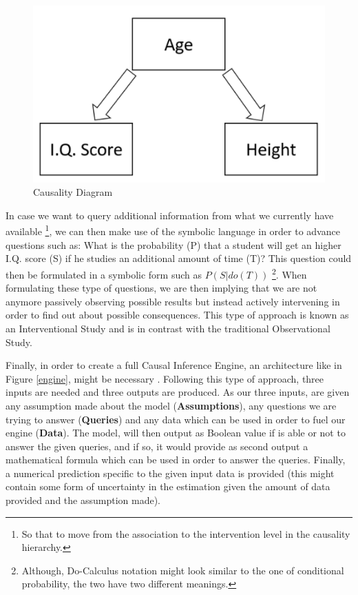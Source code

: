 \begin{figure}[ht!]%
    \centering
    \includegraphics[width=0.4\linewidth]{latex/images/caus_d.pdf}
    \vspace{-0.2cm}
    \caption{Causality Diagram}
    \label{dig_ex}
\end{figure}
\vspace{-0.5cm}

In case we want to query additional information from what we currently have available \footnote{So that to move from the association to the intervention level in the causality hierarchy.}, we can then make use of the symbolic language in order to advance questions such as: What is the probability (P) that a student will get an higher I.Q. score (S) if he studies an additional amount of time (T)? This question could then be formulated in a symbolic form such as $P(S|do(T))$  \footnote{Although, Do-Calculus notation might look similar to the one of conditional probability, the two have two different meanings.}. When formulating these type of questions, we are then implying that we are not anymore passively observing possible results but instead actively intervening in order to find out about possible consequences. This type of approach is known as an Interventional Study and is in contrast with the traditional Observational Study.

Finally, in order to create a full Causal Inference Engine, an architecture like in Figure \ref{engine}, might be necessary \cite{why}. Following this type of approach, three inputs are needed and three outputs are produced. As our three inputs, are given any assumption made about the model (\textbf{Assumptions}), any questions we are trying to answer (\textbf{Queries}) and any data which can be used in order to fuel our engine (\textbf{Data}). The model, will then output as Boolean value if is able or not to answer the given queries, and if so, it would provide as second output a mathematical formula which can be used in order to answer the queries. Finally, a numerical prediction specific to the given input data is provided (this might contain some form of uncertainty in the estimation given the amount of data provided and the assumption made).  

